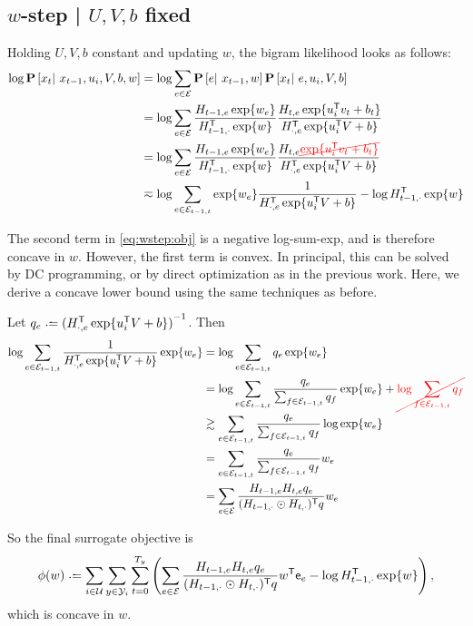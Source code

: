 \documentclass{article}
\newcommand{\ccancel}[2][black]{\color{#1}\cancel{#2}\normalcolor}
\def\e{\ensuremath{\mathsf{e}}}
\def\E{\ensuremath{\mathcal{E}}}
\def\U{\ensuremath{\mathcal{U}}}
\begin{document}
\subsection{$w$-step | $U, V, b$ fixed}
Holding $U, V, b$ constant and updating $w$, the bigram likelihood looks as follows:
\begin{align}
\log\P\left[x_t \given x_{t-1}, u_i, V, b, w\right] &= \log\sum_{e\in \E} \P\left[e \given x_{t-1}, w \right]\P\left[x_t \given e, u_i, V, b \right]\notag\\
&= \log\sum_{e\in \E} \frac{H_{t-1,e} \exp\{w_e\} }{H_{t-1,\cdot}\trans \exp\{w\}} \frac{H_{t,e} \exp\{u_i\trans v_t + b_t \} }{H_{\cdot,e}\trans \exp\{u_i\trans V + b \} }\notag\\
&= \log\sum_{e\in \E} \frac{H_{t-1,e} \exp\{w_e\} }{H_{t-1,\cdot}\trans \exp\{w\}} \frac{H_{t,e} \ccancel[red]{\exp\{u_i\trans v_t + b_t \}} }{H_{\cdot,e}\trans \exp\{u_i\trans V + b \} }\notag\\
&\eqsim \log\sum_{e\in \E_{t-1,t}} \exp\{w_e\} \frac{1}{H_{\cdot,e}\trans \exp\{u_i\trans V + b \} } - \log H_{t-1,\cdot}\trans \exp\{w\} \label{eq:wstep:obj}
\end{align}

The second term in \cref{eq:wstep:obj} is a negative log-sum-exp, and is therefore concave in $w$.  However, the first term is convex.  In principal, this can be solved by DC
programming, or by direct optimization as in the previous work.  Here, we derive a concave lower bound using the same techniques as before.

Let $q_e \defeq {(H_{\cdot, e}\trans \exp\{u_i\trans V + b\})}^{-1}$.  Then
\begin{align}
\log\sum_{e \in \E_{t-1,t}} \frac{1}{H_{\cdot, e}\trans \exp\{u_i \trans V + b\} } \exp\{w_e\} &= \log\sum_{e \in \E_{t-1,t}} q_e \exp\{w_e\} \notag\\
&= \log\sum_{e \in \E_{t-1,t}} \frac{q_e}{\sum_{f \in \E_{t-1,t}} q_f} \exp\{w_e\} + \ccancel[red]{\log\sum_{f\in\E_{t-1,t}} q_f} \notag\\
&\gtrsim \sum_{e\in \E_{t-1,t}} \frac{q_e}{\sum_{f\in\E_{t-1,t}} q_f} \log\exp\{w_e\}\notag\\
&= \sum_{e\in \E_{t-1,t}} \frac{q_e }{\sum_{f\in\E_{t-1,t}} q_f}w_e \notag\\
&= \sum_{e\in\E} \frac{H_{t-1,e}H_{t,e} q_e}{ (H_{t-1,\cdot} \odot H_{t, \cdot})\trans q} w_e\label{eq:wstep:concave}
\end{align}

So the final surrogate objective is
\begin{equation}
\phi(w) \defeq \sum_{i\in\U}\sum_{y\in\Y_i}\sum_{t=0}^{T_y} \left(\sum_{e\in\E} \frac{H_{t-1,e} H_{t,e} q_e }{ (H_{t-1,\cdot} \odot H_{t, \cdot})\trans q }w\trans \e_e - 
\log H_{t-1, \cdot}^\mathsf{T} \exp\{w\}\right), \label{eq:wstep:surrogate}
\end{equation}
which is concave in $w$.
\end{document}
